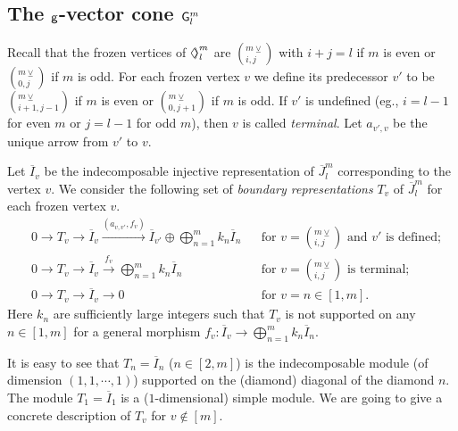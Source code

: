 \documentclass{amsart}
\theoremstyle{definition}
\theoremstyle{remark}
\numberwithin{equation}{section}
\DeclareMathOperator{\Hom}{Hom}
\newcommand{\mr}[1]{{\sf #1}}%
\newcommand{\br}[1]{\overline{#1}}
\newcommand{\g}{{\sf g}}
\newcommand{\Diamondsh}{\mathrel{\Diamond\!\!\raisebox{0.45pt}{$\rangle$}}}
\begin{document}
\subsection{The $\g$-vector cone $\mr{G}_l^m$} \label{ss:Glm}
Recall that the frozen vertices of $\Diamondsh_l^m$ are $(_{i,j}^{m\veebar})$ with $i+j=l$ if $m$ is even or $(_{0,j}^{m\veebar})$ if $m$ is odd.
For each frozen vertex $v$ we define its predecessor $v'$ to be $(_{i+1,j-1}^{m\veebar})$ if $m$ is even or $(_{0,j+1}^{m\veebar})$ if $m$ is odd.
If $v'$ is undefined (eg., $i=l-1$ for even $m$ or $j=l-1$ for odd $m$), then $v$ is called {\em terminal}.
Let $a_{v',v}$ be the unique arrow from $v'$ to $v$.

Let $\br{I}_v$ be the indecomposable injective representation of $\br{J}_l^m$ corresponding to the vertex $v$.
We consider the following set of {\em boundary representations} $T_v$ of $\br{J}_l^m$ for each frozen vertex $v$.
\begin{align}
\label{eq:injres1} & 0\to T_v \to \br{I}_v \xrightarrow{(a_{v,v'},f_v)} \br{I}_{v'}\oplus \bigoplus_{n=1}^m k_n \br{I}_n & & \text{for $v=(_{i,j}^{m\veebar})$ and $v'$ is defined};\\
\label{eq:injres2} & 0\to T_v \to \br{I}_v \xrightarrow{f_v} \bigoplus_{n=1}^m k_n \br{I}_n & & \text{for $v=(_{i,j}^{m\veebar})$ is terminal};\\
\label{eq:injres3} & 0\to T_v \to \br{I}_v \to 0 & & \text{for $v=n\in [1,m]$}.
\end{align}
\noindent Here $k_n$ are sufficiently large integers such that $T_v$ is not supported on any $n\in [1,m]$
for a general morphism $f_v:\br{I}_v \to  \bigoplus_{n=1}^m k_n \br{I}_n$. 

It is easy to see that $T_n=\br{I}_n$ ($n\in [2,m]$) is the indecomposable module (of dimension $(1,1,\cdots,1)$) supported on the (diamond) diagonal of the diamond $n$. The module $T_1=\br{I}_1$ is a ($1$-dimensional) simple module. We are going to give a concrete description of $T_v$ for $v\notin [m]$.
\end{document}
